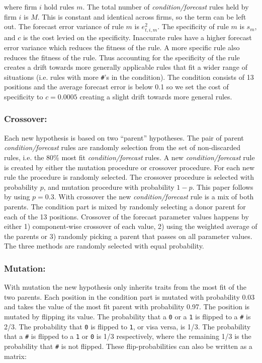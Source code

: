 \documentclass[preprint, 12pt]{elsarticle}
\begin{document}
where firm $i$ hold rules $m$. The total number of \emph{condition/forecast} rules held by firm $i$ is $M$. This is constant and identical across firms, so the term can be left out. The forecast error variance of rule $m$ is $e^2_{t,i,m}$. The specificity of rule $m$ is $s_m$, and $c$ is the cost levied on the specificity. Inaccurate rules have a higher forecast error variance which reduces the fitness of the rule. A more specific rule also reduces the fitness of the rule. Thus accounting for the specificity of the rule creates a drift towards more generally applicable rules that fit a wider range of situations (i.e. rules with more \texttt{\#}'s in the condition). The condition consists of 13 positions and the average forecast error is below 0.1 so we set the cost of specificity to $c = 0.0005$ creating a slight drift towards more general rules.

\subsubsection*{Crossover:}
Each new hypothesis is based on two ``parent'' hypotheses. The pair of parent \emph{condition/forecast} rules are randomly selection from the set of non-discarded rules, i.e. the 80\% most fit \emph{condition/forecast} rules. A new \emph{condition/forecast} rule is created by either the mutation procedure or crossover procedure. For each new rule the procedure is randomly selected. The crossover procedure is selected with probability $p$, and mutation procedure with probability $1-p$. This paper follows \citet[chapter~3]{Arthur_2014} by using $p = 0.3$. With crossover the new \emph{condition/forecast} rule is a mix of both parents. The condition part is mixed by randomly selecting a donor parent for each of the 13 positions. Crossover of the forecast parameter values happens by either 1) component-wise crossover of each value, 2) using the weighted average of the parents or 3) randomly picking a parent that passes on all parameter values. The three methods are randomly selected with equal probability.

\subsubsection*{Mutation:}
With mutation the new hypothesis only inherits traits from the most fit of the two parents. Each position in the condition part is mutated with probability 0.03 and takes the value of the most fit parent with probability 0.97. The position is mutated by flipping its value. The probability that a \texttt{0} or a \texttt{1} is flipped to a \texttt{\#} is 2/3. The probability that \texttt{0} is flipped to \texttt{1}, or visa versa, is 1/3. The probability that a \texttt{\#} is flipped to a \texttt{1} or \texttt{0} is 1/3 respectively, where the remaining 1/3 is the probability that \texttt{\#} is not flipped. These flip-probabilities can also be written as a matrix:
\end{document}
